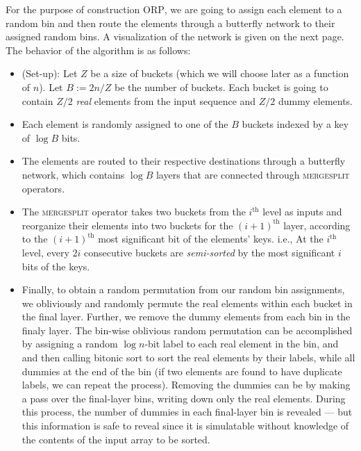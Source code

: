 For the purpose of construction \textsc{ORP}, we are going to assign each element to a random bin and then route the elements through a butterfly network to their assigned random bins. A visualization of the network is given on the next page. The behavior of the algorithm is as follows:
\begin{itemize}
    \item (Set-up): Let $Z$ be a size of buckets (which we will choose later as a function of $n$). Let $B := 2n/Z$ be the number of buckets. Each bucket is going to contain $Z/2$ \emph{real} elements from the input sequence and $Z/2$ dummy elements.

    \item Each element is randomly  assigned to one of the $B$ buckets indexed by a key of  $\log B$ bits.

    \item The elements are routed to their respective destinations through a butterfly network, which contains $\log B$ layers that are connected through \textsc{mergesplit} operators.

    \item The \textsc{mergesplit} operator takes two buckets from the $i^{\text{th}}$ level as inputs and reorganize their elements into two buckets for  the $(i+1)^{\text{th}}$ layer, according to the $(i+1)^{\text{th}}$ most significant bit of the elements' keys. i.e., At the $i^{\text{th}}$ level, every $2i$ consecutive buckets are \emph{semi-sorted} by the most significant $i$ bits of the keys.

    \item Finally, 
to obtain a random permutation from our random bin assignments, 
we obliviously and randomly permute the real elements within 
each bucket in the final layer. Further, we remove
the dummy elements 
from each bin in the finaly layer. 
The bin-wise oblivious random permutation 
can be accomplished by assigning a random $\log n$-bit label
to each real element in the bin, and 
and then calling bitonic sort to sort the real elements by their labels,
while all dummies at the end of the bin (if two elements
are found to have duplicate labels, we can repeat the process).
Removing the dummies can be by making a pass over the final-layer bins,
writing down only the real elements. 
During this process, the number of dummies in each final-layer bin
is revealed --- but this information is safe to reveal
since it is simulatable without knowledge
of the contents  
of the input array to be sorted.
\end{itemize}

